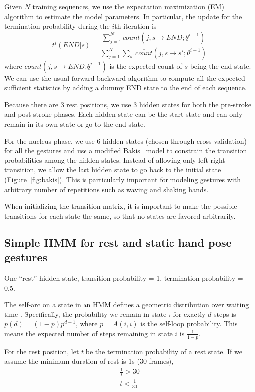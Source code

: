 Given $N$ training sequences, we use the expectation maximization (EM) algorithm to estimate the model parameters. In
particular, the update for the termination probability during the $i$th iteration is 
\begin{displaymath}
t^i(END|s) = \frac{\sum_{j = 1}^N \overline{count}(j, s\rightarrow END;\underline{\theta}^{i-1})}
    {\sum_{j = 1}^N\sum_{s'} \overline{count}(j, s\rightarrow s';\underline{\theta}^{i-1})}
\end{displaymath}
where $\overline{count}(j, s\rightarrow END;\underline{\theta}^{i-1})$ is the expected count of 
$s$ being the end state. We can use the usual forward-backward algorithm to compute all the 
expected sufficient statistics by adding a dummy END state to the end of each sequence.

Because there are 3 rest positions, we use 3 hidden states for both the pre-stroke and post-stroke phases.
Each hidden state can be the start state and can only remain in its own state or go to the end state.
 
For the nucleus phase, we use 6 hidden states (chosen through cross validation) for all the gestures and use a modified Bakis~\cite{bauer2000} model to constrain the transition probabilities
among the hidden states. Instead of allowing only left-right transition, we allow the last hidden state
to go back to the initial state (Figure~\ref{fig:bakis}). This is particularly important for modeling gestures with arbitrary number of
repetitions such as waving and shaking hands. 

When initializing the transition matrix, it is important to make the possible
transitions for each state the same, so that no states are favored arbitrarily.

\subsection{Simple HMM for rest and static hand pose gestures}
One ``rest'' hidden state, transition probability = 1, termination probability =
0.5.

The self-arc on a state in an HMM defines a geometric distribution over waiting
time \cite{murphy02}. Specifically, the probability we remain in state $i$ for
exactly $d$ steps is $p(d) = (1 - p)p^{d - 1}$, where $p = A(i, i)$ is the
self-loop probability. This means the expected number of steps remaining in
state $i$ is $\frac{1}{1 - p}$.

For the rest position, let $t$ be the termination probability of a rest state.
If we assume the minimum duration of rest is 1s (30 frames), 
\begin{align}
\frac{1}{t} > 30 \\
t < \frac{1}{30}
\end{align}

